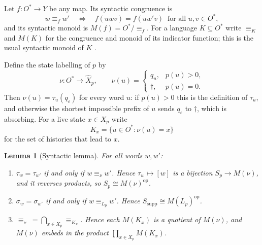 \documentclass[10pt]{article}
\newtheorem{lemma}[theorem]{Lemma}
\theoremstyle{definition}
\theoremstyle{remark}
\newcommand{\Obs}{O}
\newcommand{\eps}{\varepsilon}
\begin{document}
Let $f:\Obs^*\to Y$ be any map.  Its syntactic congruence is
\[
  w\equiv_f w'
  \quad\Longleftrightarrow\quad
  f(uwv)=f(uw'v)\ \text{ for all }u,v\in\Obs^*,
\]
and its syntactic monoid is $M(f)=\Obs^*/{\equiv_f}$.  For a language
$K\subseteq\Obs^*$ write $\equiv_K$ and $M(K)$ for the congruence and
monoid of its indicator function; this is the usual syntactic monoid
of $K$ \cite{Pin1986}.

Define the state labelling of $p$ by
\[
  \nu:\Obs^*\to\widehat X_p,
  \qquad
  \nu(u)=
  \begin{cases}
    q_u,&p(u)>0,\\
    \dagger,&p(u)=0.
  \end{cases}
\]
Then $\nu(u)=\tau_u(q_\eps)$ for every word $u$: if $p(u)>0$ this is
the definition of $\tau_u$, and otherwise the shortest impossible
prefix of $u$ sends $q_\eps$ to $\dagger$, which is absorbing.  For a
live state $x\in X_p$ write
\[
  K_x=\{u\in\Obs^*:\nu(u)=x\}
\]
for the set of histories that lead to $x$.

\begin{lemma}[Syntactic lemma]
\label{lem:syntactic}
For all words $w,w'$:
\begin{enumerate}[label=(\roman*)]
  \item $\tau_w=\tau_{w'}$ if and only if $w\equiv_\nu w'$.  Hence
        $\tau_w\mapsto[w]$ is a bijection $S_p\to M(\nu)$, and it
        reverses products, so $S_p\cong M(\nu)^{\mathrm{op}}$.
  \item $\sigma_w=\sigma_{w'}$ if and only if $w\equiv_{L_p}w'$.
        Hence $S_{\mathrm{supp}}\cong M(L_p)^{\mathrm{op}}$.
  \item $\equiv_\nu\;=\bigcap_{x\in X_p}\equiv_{K_x}$.  Hence each
        $M(K_x)$ is a quotient of $M(\nu)$, and $M(\nu)$ embeds in the
        product $\prod_{x\in X_p}M(K_x)$.
\end{enumerate}
\end{lemma}
\end{document}
